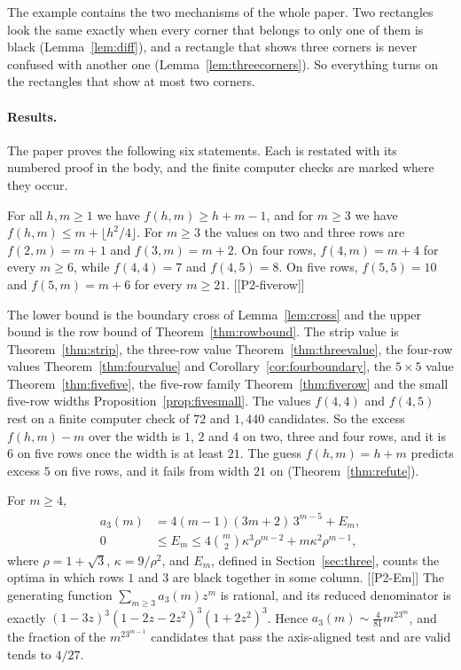 The example contains the two mechanisms of the whole paper. Two rectangles look the
same exactly when every corner that belongs to only one of them is black
(Lemma~\ref{lem:diff}), and a rectangle that shows three corners is never confused
with another one (Lemma~\ref{lem:threecorners}). So everything turns on the
rectangles that show at most two corners.

\paragraph{Results.} The paper proves the following six statements. Each is restated
with its numbered proof in the body, and the finite computer checks are marked where
they occur.

\begin{thmA}
For all $h,m\ge1$ we have $f(h,m)\ge h+m-1$, and for $m\ge3$ we have
$f(h,m)\le m+\lfloor h^2/4\rfloor$. For $m\ge3$ the values on two and three rows
are $f(2,m)=m+1$ and $f(3,m)=m+2$. On four rows, $f(4,m)=m+4$ for every $m\ge6$,
while $f(4,4)=7$ and $f(4,5)=8$. On five rows, $f(5,5)=10$ and $f(5,m)=m+6$ for every
$m\ge21$. [[P2-fiverow]]
\end{thmA}

The lower bound is the boundary cross of Lemma~\ref{lem:cross} and the upper bound is
the row bound of Theorem~\ref{thm:rowbound}. The strip value is
Theorem~\ref{thm:strip}, the three-row value Theorem~\ref{thm:threevalue}, the
four-row values Theorem~\ref{thm:fourvalue} and Corollary~\ref{cor:fourboundary}, the
$5\times5$ value Theorem~\ref{thm:fivefive}, the five-row family
Theorem~\ref{thm:fiverow} and the small five-row widths
Proposition~\ref{prop:fivesmall}. The values $f(4,4)$ and $f(4,5)$ rest on a finite
computer check of $72$ and $1{,}440$ candidates. So the excess $f(h,m)-m$ over the
width is $1$, $2$ and $4$ on two, three and four rows, and it is $6$ on five rows once
the width is at least $21$. The guess $f(h,m)=h+m$ predicts excess $5$ on five rows,
and it fails from width $21$ on (Theorem~\ref{thm:refute}).

\begin{thmB}
For $m\ge4$,
\begin{align*}
a_3(m)&=4(m-1)(3m+2)\,3^{m-5}+E_m,\\
0&\le E_m\le4\binom m2\kappa^3\rho^{m-2}+m\kappa^2\rho^{m-1},
\end{align*}
where $\rho=1+\sqrt3$, $\kappa=9/\rho^2$, and $E_m$, defined in
Section~\ref{sec:three}, counts the optima in which rows $1$ and $3$ are black
together in some column. [[P2-Em]] The generating function $\sum_{m\ge3}a_3(m)z^m$ is
rational, and its reduced denominator is exactly
$(1-3z)^3(1-2z-2z^2)^3(1+2z^2)^3$. Hence $a_3(m)\sim\frac4{81}m^23^m$, and the
fraction of the $m^23^{m-1}$ candidates that pass the axis-aligned test and are valid
tends to $4/27$.
\end{thmB}

